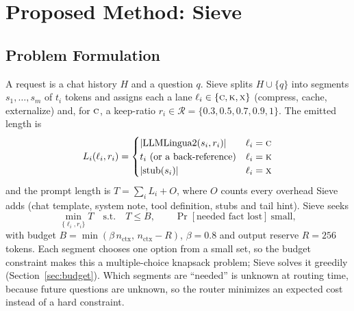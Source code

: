 \documentclass[journal]{IEEEtran}
\begin{document}
\section{Proposed Method: Sieve}\label{sec:method}
\subsection{Problem Formulation}
A request is a chat history $H$ and a question $q$. Sieve splits $H\cup\{q\}$ into segments $s_1,\dots,s_m$ of $t_i$ tokens and assigns
each a lane $\ell_i\in\{\textsc{c},\textsc{k},\textsc{x}\}$ (compress, cache, externalize) and, for $\textsc{c}$, a keep-ratio
$r_i\in\mathcal{R}=\{0.3, 0.5, 0.7, 0.9, 1\}$. The emitted length is
\begin{equation}
L_i(\ell_i,r_i)=\begin{cases}|\mathrm{LLMLingua2}(s_i,r_i)| & \ell_i=\textsc{c}\\ t_i\ \text{(or a back-reference)} & \ell_i=\textsc{k}\\ |\mathrm{stub}(s_i)| & \ell_i=\textsc{x}\end{cases}
\end{equation}
and the prompt length is $T=\sum_i L_i+O$, where $O$ counts every overhead Sieve adds (chat template, system note, tool definition,
stubs and tail hint). Sieve seeks
\begin{equation}
\min_{\{\ell_i,r_i\}} T\quad\text{s.t.}\quad T\le B,\qquad \Pr[\text{needed fact lost}]\ \text{small},
\label{eq:obj}
\end{equation}
with budget $B=\min(\beta\,n_\text{ctx},\,n_\text{ctx}-R)$, $\beta=0.8$ and output reserve $R=256$ tokens. Each
segment chooses one option from a small set, so the budget constraint makes this a multiple-choice knapsack problem; Sieve solves it
greedily (Section~\ref{sec:budget}). Which segments are ``needed'' is unknown at routing time, because future questions are unknown,
so the router minimizes an expected cost instead of a hard constraint.
\end{document}
